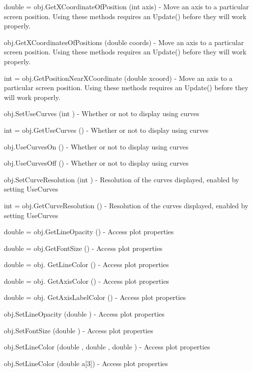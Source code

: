 \begin{DoxyItemize}
\item {\ttfamily double = obj.\-Get\-X\-Coordinate\-Of\-Position (int axis)} -\/ Move an axis to a particular screen position. Using these methods requires an Update() before they will work properly.  
\item {\ttfamily obj.\-Get\-X\-Coordinates\-Of\-Positions (double coords)} -\/ Move an axis to a particular screen position. Using these methods requires an Update() before they will work properly.  
\item {\ttfamily int = obj.\-Get\-Position\-Near\-X\-Coordinate (double xcoord)} -\/ Move an axis to a particular screen position. Using these methods requires an Update() before they will work properly.  
\item {\ttfamily obj.\-Set\-Use\-Curves (int )} -\/ Whether or not to display using curves  
\item {\ttfamily int = obj.\-Get\-Use\-Curves ()} -\/ Whether or not to display using curves  
\item {\ttfamily obj.\-Use\-Curves\-On ()} -\/ Whether or not to display using curves  
\item {\ttfamily obj.\-Use\-Curves\-Off ()} -\/ Whether or not to display using curves  
\item {\ttfamily obj.\-Set\-Curve\-Resolution (int )} -\/ Resolution of the curves displayed, enabled by setting Use\-Curves  
\item {\ttfamily int = obj.\-Get\-Curve\-Resolution ()} -\/ Resolution of the curves displayed, enabled by setting Use\-Curves  
\item {\ttfamily double = obj.\-Get\-Line\-Opacity ()} -\/ Access plot properties  
\item {\ttfamily double = obj.\-Get\-Font\-Size ()} -\/ Access plot properties  
\item {\ttfamily double = obj. Get\-Line\-Color ()} -\/ Access plot properties  
\item {\ttfamily double = obj. Get\-Axis\-Color ()} -\/ Access plot properties  
\item {\ttfamily double = obj. Get\-Axis\-Label\-Color ()} -\/ Access plot properties  
\item {\ttfamily obj.\-Set\-Line\-Opacity (double )} -\/ Access plot properties  
\item {\ttfamily obj.\-Set\-Font\-Size (double )} -\/ Access plot properties  
\item {\ttfamily obj.\-Set\-Line\-Color (double , double , double )} -\/ Access plot properties  
\item {\ttfamily obj.\-Set\-Line\-Color (double a\mbox{[}3\mbox{]})} -\/ Access plot properties  

\end{DoxyItemize}

